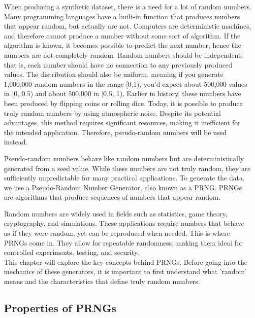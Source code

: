 When producing a synthetic dataset, there is a need for a lot of random numbers. Many programming languages have a built-in function that produces numbers that appear random, but actually are not. Computers are deterministic machines, and therefore cannot produce a number without some sort of algorithm. If the algorithm is known, it becomes possible to predict the next number; hence the numbers are not completely random. Random numbers should be independent; that is, each number should have no connection to any previously produced values. The distribution should also be uniform, meaning if you generate 1,000,000 random numbers in the range [0,1), you'd expect about 500,000 values in [0, 0.5) and about 500,000 in [0.5, 1). Earlier in history, these numbers have been produced by flipping coins or rolling dice. Today, it is possible to produce truly random numbers by using atmospheric noise. Despite its potential advantages, this method requires significant resources, making it inefficient for the intended application. Therefore, pseudo-random numbers will be used instead.
\newline

\noindent Pseudo-random numbers behave like random numbers but are deterministically generated from a seed value. While
these numbers are not truly random, they are sufficiently unpredictable for many practical applications.
To generate the data, we use a Pseudo-Random Number Generator, also known as a PRNG.
PRNGs are algorithms that produce sequences of numbers that appear random.
\newline

\noindent Random numbers are widely used in fields such as statistics, game theory, cryptography, and simulations. These applications require numbers that behave
as if they were random, yet can be reproduced when needed. This is where
PRNGs come in. They allow for repeatable randomness, making them ideal for
controlled experiments, testing, and security.
\\
This chapter will explore the key concepts behind PRNGs. Before going into the
mechanics of these generators, it is important to first understand what ’random’
means and the characteristics that define truly random numbers.

\subsection{Properties of PRNGs}


